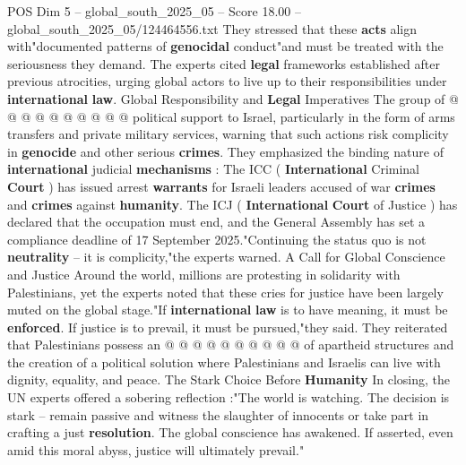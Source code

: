 \begin{textsample}{POS Dim 5 – global\_south\_2025\_05 – Score 18.00 – global\_south\_2025\_05/124464556.txt}
They stressed that these \textbf{acts} align with"documented patterns of \textbf{genocidal} conduct"and must be treated with the seriousness they demand.
The experts cited \textbf{legal} frameworks established after previous atrocities, urging global actors to live up to their responsibilities under \textbf{international} \textbf{law}.
Global Responsibility and \textbf{Legal} Imperatives The group of @ @ @ @ @ @ @ @ @ @ political support to Israel, particularly in the form of arms transfers and private military services, warning that such actions risk complicity in \textbf{genocide} and other serious \textbf{crimes}.
They emphasized the binding nature of \textbf{international} judicial \textbf{mechanisms} : The ICC ( \textbf{International} Criminal \textbf{Court} ) has issued arrest \textbf{warrants} for Israeli leaders accused of war \textbf{crimes} and \textbf{crimes} against \textbf{humanity}.
The ICJ ( \textbf{International} \textbf{Court} of Justice ) has declared that the occupation must end, and the General Assembly has set a compliance deadline of 17 September 2025."Continuing the status quo is not \textbf{neutrality} -- it is complicity,"the experts warned.
A Call for Global Conscience and Justice Around the world, millions are protesting in solidarity with Palestinians, yet the experts noted that these cries for justice have been largely muted on the global stage."If \textbf{international} \textbf{law} is to have meaning, it must be \textbf{enforced}.
If justice is to prevail, it must be pursued,"they said.
They reiterated that Palestinians possess an @ @ @ @ @ @ @ @ @ @ of apartheid structures and the creation of a political solution where Palestinians and Israelis can live with dignity, equality, and peace.
The Stark Choice Before \textbf{Humanity} In closing, the UN experts offered a sobering reflection :"The world is watching.
The decision is stark -- remain passive and witness the slaughter of innocents or take part in crafting a just \textbf{resolution}.
The global conscience has awakened.
If asserted, even amid this moral abyss, justice will ultimately prevail."

\end{textsample}
